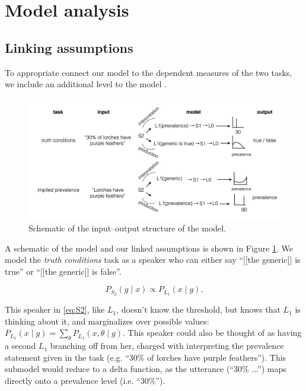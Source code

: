 \documentclass[10pt,letterpaper]{article}
\begin{document}
\section{Model analysis}

\subsection{Linking assumptions}

To appropriate connect our model to the dependent measures of the two tasks, we include an additional level to the model \cite{Degen2014}. 


\begin{figure}
\centering
    \includegraphics[width=\columnwidth]{model_schematic}
    \caption{Schematic of the input--output structure of the model.}
  \label{fig:model}
\end{figure}

A schematic of the model and our linked assumptions is shown in Figure \ref{fig:model}.
We model the \emph{truth conditions} task as a speaker who can either say ``[[the generic]] is true'' or ``[[the generic]] is false''.

\begin{equation} 
P_{S_{2}}(g \mid x) \propto {P_{L_{1}}(x \mid g)}.
\label{eq:S2}
\end{equation}

This speaker in \eqref{eq:S2}, like $L_{1}$, doesn't know the threshold, but knows that $L_{1}$ is thinking about it, and marginalizes over possible values: $ P_{L_{1}}(x \mid g) = \sum_{\theta} P_{L_{1}}(x , \theta \mid g) $. This speaker could also be thought of as having a second $L_{1}$ branching off from her, charged with interpreting the prevalence statement given in the task (e.g. ``30\% of lorches have purple feathers''). This submodel would reduce to a delta function, as the utterance (``30\% ...'') maps directly onto a prevalence level (i.e. ``30\%'').
\end{document}
